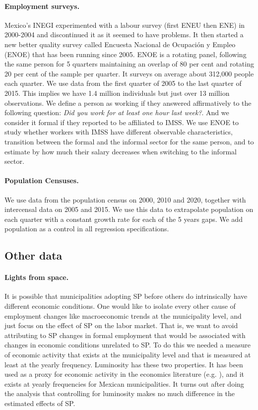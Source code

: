 \documentclass[oneside,11pt]{article}
\begin{document}
\paragraph{Employment surveys.} Mexico's INEGI experimented with a labour survey (first ENEU then ENE) in 2000-2004 and discontinued it as it seemed to have problems. It then started a new better quality survey called Encuesta Nacional de Ocupación y Empleo (ENOE) that has been running since 2005.  ENOE is a rotating panel, following the same person for 5 quarters maintaining an overlap of 80 per cent and rotating 20 per cent of the sample per quarter. It surveys on average about 312,000 people each quarter. We use data from the first quarter of 2005 to the last quarter of 2015. This implies we have 1.4 million individuals but just over 13 million observations. We define a person as working if they answered affirmatively to the following question: \textit{Did you work for at least one hour last week?}. And we consider it formal if they reported to be affiliated to IMSS. We use ENOE to study whether workers with IMSS have different observable characteristics, transition between the formal and the informal sector for the same person, and to estimate by how much their salary decreases when switching to the informal sector.

\paragraph{Population Censuses.} We use data from the population census on 2000, 2010 and 2020, together with intercensal data on 2005 and 2015. We use this data to extrapolate population on each quarter with a constant growth rate for each of the 5 years gaps. We add population as a control in all regression specifications. 

\subsection{Other data}

\paragraph{Lights from space.} It is possible that municipalities adopting SP before others do intrinsically have different economic conditions. One would like to isolate every other cause of employment changes like macroeconomic trends at the municipality level, and just focus on the effect of SP on the labor market. That is, we  want to avoid attributing to SP changes in formal employment that would be associated with changes in economic conditions unrelated to SP. To do this we needed a measure of economic activity that exists at the municipality level and that is measured at least at the yearly frequency. Luminosity has these two properties. It has been used as a proxy for economic activity in the economics literature (e.g. \cite{Micha}), and it exists at yearly frequencies for Mexican municipalities. It turns out after doing the analysis that controlling for luminosity makes no much difference in the estimated effects of SP. 
\end{document}
